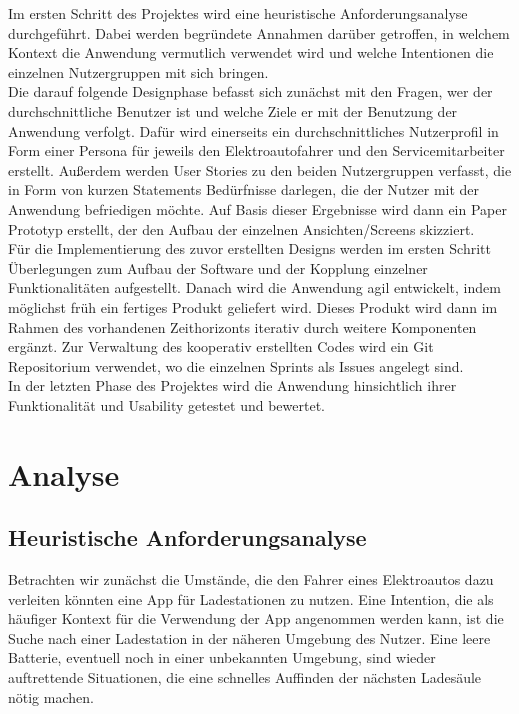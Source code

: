\documentclass[12pt, a4paper, oneside]{article}
\begin{document}
Im ersten Schritt des Projektes wird eine heuristische Anforderungsanalyse durchgeführt. Dabei werden begründete Annahmen darüber getroffen, in welchem Kontext die Anwendung vermutlich verwendet wird und welche Intentionen die einzelnen Nutzergruppen mit sich bringen.\\

Die darauf folgende Designphase befasst sich zunächst mit den Fragen, wer der durchschnittliche Benutzer ist und welche Ziele er mit der Benutzung der Anwendung verfolgt. Dafür wird einerseits ein durchschnittliches Nutzerprofil in Form einer Persona für jeweils den Elektroautofahrer und den Servicemitarbeiter erstellt. Außerdem werden User Stories zu den beiden Nutzergruppen verfasst, die in Form von kurzen Statements Bedürfnisse darlegen, die der Nutzer mit der Anwendung befriedigen möchte. Auf Basis dieser Ergebnisse wird dann ein Paper Prototyp erstellt, der den Aufbau der einzelnen Ansichten/Screens skizziert.\\

Für die Implementierung des zuvor erstellten Designs werden im ersten Schritt Überlegungen zum Aufbau der Software und der Kopplung einzelner Funktionalitäten aufgestellt. Danach wird die Anwendung agil entwickelt, indem möglichst früh ein fertiges Produkt geliefert wird. Dieses Produkt wird dann im Rahmen des vorhandenen Zeithorizonts iterativ durch weitere Komponenten ergänzt. Zur Verwaltung des kooperativ erstellten Codes wird ein Git Repositorium verwendet, wo die einzelnen Sprints als Issues angelegt sind.\\

In der letzten Phase des Projektes wird die Anwendung hinsichtlich ihrer Funktionalität und Usability getestet und bewertet.\\

\section{Analyse}
\subsection{Heuristische Anforderungsanalyse}
Betrachten wir zunächst die Umstände, die den Fahrer eines Elektroautos dazu verleiten könnten eine App für Ladestationen zu nutzen. Eine Intention, die als häufiger Kontext für die Verwendung der App angenommen werden kann, ist die Suche nach einer Ladestation in der näheren Umgebung des Nutzer. Eine leere Batterie, eventuell noch in einer unbekannten Umgebung, sind wieder auftrettende Situationen, die eine schnelles Auffinden der nächsten Ladesäule nötig machen.\\
\end{document}
